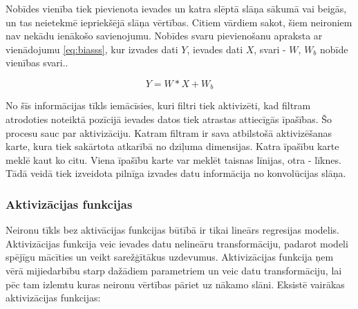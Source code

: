 \documentclass[12pt,paper=A4]{report}
\begin{document}
Nobīdes vienība tiek pievienota ievades un katra slēptā slāņa sākumā vai beigās, un tas neietekmē iepriekšējā slāņa vērtības. Citiem vārdiem sakot, šiem neironiem nav nekādu ienākošo savienojumu. Nobīdes svaru pievienošanu apraksta ar vienādojumu \ref{eq:biasss}, kur izvades dati $Y$, ievades dati $X$, svari - $W$, $W_b$ nobīde vienības svari..  

\begin{equation}
Y = W * X + W_b
\label{eq:biasss}
\end{equation}

No šīs informācijas tīkls iemācīsies, kuri filtri tiek aktivizēti, kad filtram atrodoties noteiktā pozīcijā ievades datos tiek atrastas attiecīgās īpašības. Šo procesu sauc par aktivizāciju. Katram filtram ir sava atbilstošā aktivizēšanas karte, kura tiek sakārtota atkarībā no dziļuma dimensijas. Katra īpašību karte meklē kaut ko citu. Viena īpašību karte var meklēt taisnas līnijas, otra - līknes. Tādā veidā tiek izveidota pilnīga izvades datu informācija no konvolūcijas slāņa. 

\subsubsection{Aktivizācijas funkcijas}
Neironu tīkls bez aktivācijas funkcijas būtībā ir tikai lineārs regresijas modelis. Aktivizācijas funkcija veic ievades datu nelineāru transformāciju, padarot modeli spējīgu mācīties un veikt sarežģītākus uzdevumus.
Aktivizācijas funkcija ņem vērā mijiedarbību starp dažādiem parametriem un veic datu transformāciju, lai pēc tam izlemtu kuras neironu vērtības pāriet uz nākamo slāni. Eksistē vairākas aktivizācijas funkcijas:
\end{document}
